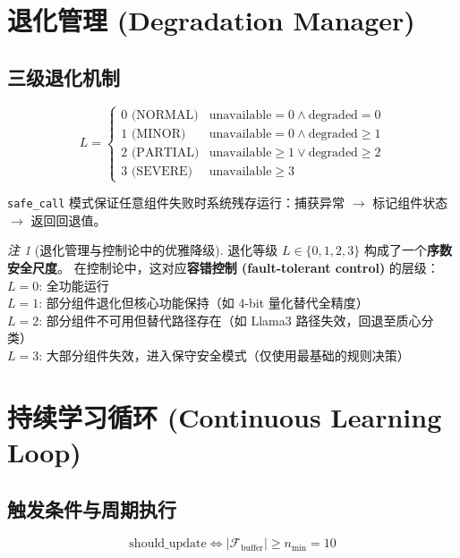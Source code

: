 \documentclass[11pt,a4paper]{ctexart}
\theoremstyle{remark}
\newtheorem{remark}{注}[section]
\begin{document}
\section{退化管理 (Degradation Manager)}

\subsection{三级退化机制}

\begin{equation}
L =
\begin{cases}
0 \text{ (NORMAL)} & \text{unavailable} = 0 \land \text{degraded} = 0 \\
1 \text{ (MINOR)} & \text{unavailable} = 0 \land \text{degraded} \geq 1 \\
2 \text{ (PARTIAL)} & \text{unavailable} \geq 1 \lor \text{degraded} \geq 2 \\
3 \text{ (SEVERE)} & \text{unavailable} \geq 3
\end{cases}
\end{equation}

\texttt{safe\_call} 模式保证任意组件失败时系统残存运行：捕获异常 $\to$ 标记组件状态 $\to$ 返回回退值。

\begin{remark}[退化管理与控制论中的优雅降级]
退化等级 $L \in \{0,1,2,3\}$ 构成了一个\textbf{序数安全尺度}。
在控制论中，这对应\textbf{容错控制 (fault-tolerant control)} 的层级：
\\ $L=0$: 全功能运行
\\ $L=1$: 部分组件退化但核心功能保持（如 4-bit 量化替代全精度）
\\ $L=2$: 部分组件不可用但替代路径存在（如 Llama3 路径失效，回退至质心分类）
\\ $L=3$: 大部分组件失效，进入保守安全模式（仅使用最基础的规则决策）
\end{remark}

\section{持续学习循环 (Continuous Learning Loop)}

\subsection{触发条件与周期执行}

\begin{equation}
\text{should\_update} \iff |\mathcal{F}_{\text{buffer}}| \geq n_{\min} = 10
\end{equation}
\end{document}
